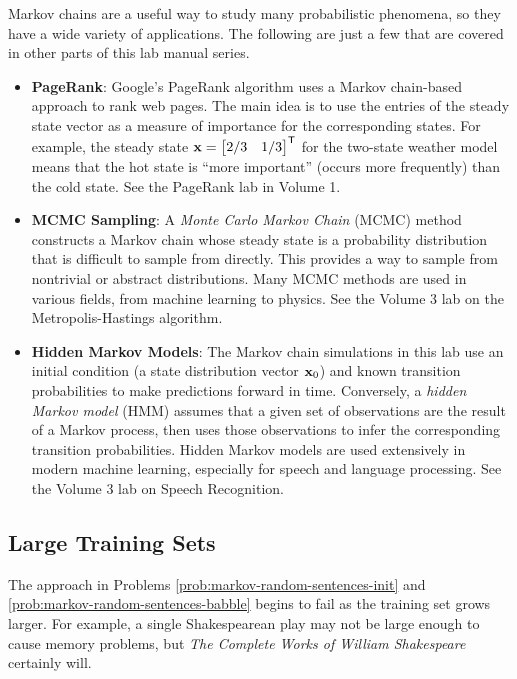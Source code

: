 Markov chains are a useful way to study many probabilistic phenomena, so they have a wide variety of applications.
The following are just a few that are covered in other parts of this lab manual series.
\begin{itemize}
\item \textbf{PageRank}: Google's PageRank algorithm uses a Markov chain-based approach to rank web pages.
The main idea is to use the entries of the steady state vector as a measure of importance for the corresponding states.
For example, the steady state $\mathbf{x} = \begin{bmatrix}2/3 & 1/3\end{bmatrix}^{\mathsf T}$ for the two-state weather model means that the hot state is ``more important'' (occurs more frequently) than the cold state.
See the PageRank lab in Volume 1.

\item \textbf{MCMC Sampling}: A \emph{Monte Carlo Markov Chain} (MCMC) method constructs a Markov chain whose steady state is a probability distribution that is difficult to sample from directly.
This provides a way to sample from nontrivial or abstract distributions.
Many MCMC methods are used in various fields, from machine learning to physics.
See the Volume 3 lab on the Metropolis-Hastings algorithm.

\item \textbf{Hidden Markov Models}: The Markov chain simulations in this lab use an initial condition (a state distribution vector $\mathbf{x}_0$) and known transition probabilities to make predictions forward in time.
Conversely, a \emph{hidden Markov model} (HMM) assumes that a given set of observations are the result of a Markov process, then uses those observations to infer the corresponding transition probabilities.
Hidden Markov models are used extensively in modern machine learning, especially for speech and language processing.
See the Volume 3 lab on Speech Recognition.
\end{itemize}

\subsection*{Large Training Sets} %

The approach in Problems \ref{prob:markov-random-sentences-init} and \ref{prob:markov-random-sentences-babble} begins to fail as the training set grows larger.
For example, a single Shakespearean play may not be large enough to cause memory problems, but \emph{The Complete Works of William Shakespeare} certainly will.

